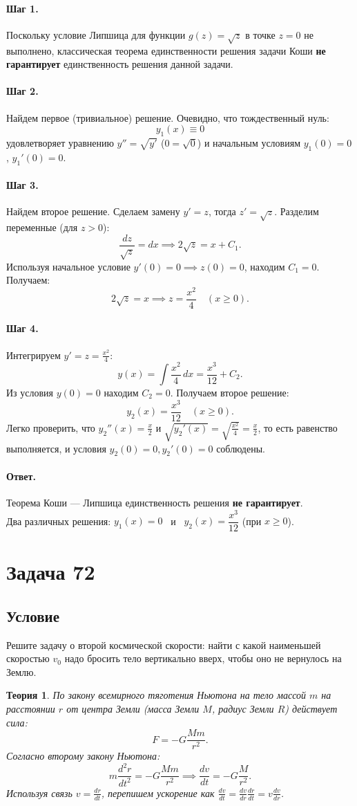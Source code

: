 \documentclass[12pt,a4paper]{article}
\theoremstyle{solution}
\newtheorem*{theory}{Теория}
\newcommand{\task}[1]{\newpage\section*{Задача #1}}
\newcommand{\answer}{\paragraph{Ответ.}}
\newcommand{\step}[1]{\paragraph{Шаг #1.}}
\begin{document}
\step{1} Поскольку условие Липшица для функции $g(z) = \sqrt{z}$ в точке $z = 0$ не выполнено, классическая теорема единственности решения задачи Коши \textbf{не гарантирует} единственность решения данной задачи.

\step{2} Найдем первое (тривиальное) решение. Очевидно, что тождественный нуль:
\[
y_1(x) \equiv 0
\]
удовлетворяет уравнению $y'' = \sqrt{y'}$ ($0 = \sqrt{0}$) и начальным условиям $y_1(0) = 0$, $y_1'(0) = 0$.

\step{3} Найдем второе решение. Сделаем замену $y' = z$, тогда $z' = \sqrt{z}$. Разделим переменные (для $z > 0$):
\[
\frac{dz}{\sqrt{z}} = dx \implies 2\sqrt{z} = x + C_1.
\]
Используя начальное условие $y'(0) = 0 \implies z(0) = 0$, находим $C_1 = 0$. Получаем:
\[
2\sqrt{z} = x \implies z = \frac{x^2}{4} \quad (x \geq 0).
\]

\step{4} Интегрируем $y' = z = \frac{x^2}{4}$:
\[
y(x) = \int \frac{x^2}{4}\,dx = \frac{x^3}{12} + C_2.
\]
Из условия $y(0) = 0$ находим $C_2 = 0$. Получаем второе решение:
\[
y_2(x) = \frac{x^3}{12} \quad (x \geq 0).
\]
Легко проверить, что $y_2''(x) = \frac{x}{2}$ и $\sqrt{y_2'(x)} = \sqrt{\frac{x^2}{4}} = \frac{x}{2}$, то есть равенство выполняется, и условия $y_2(0) = 0, y_2'(0) = 0$ соблюдены.

\answer
Теорема Коши — Липшица единственность решения \textbf{не гарантирует}. \\
Два различных решения: $y_1(x) = 0$ \ и \ $y_2(x) = \dfrac{x^3}{12}$ (при $x \geq 0$).

\task{72}
\subsection*{Условие}
Решите задачу о второй космической скорости: найти с какой наименьшей скоростью $v_0$ надо бросить тело вертикально вверх, чтобы оно не вернулось на Землю.

\begin{theory}
По закону всемирного тяготения Ньютона на тело массой $m$ на расстоянии $r$ от центра Земли (масса Земли $M$, радиус Земли $R$) действует сила:
\[
F = -G \frac{Mm}{r^2}.
\]
Согласно второму закону Ньютона:
\[
m \frac{d^2 r}{dt^2} = -G \frac{Mm}{r^2} \implies \frac{dv}{dt} = -G \frac{M}{r^2}.
\]
Используя связь $v = \frac{dr}{dt}$, перепишем ускорение как $\frac{dv}{dt} = \frac{dv}{dr} \frac{dr}{dt} = v \frac{dv}{dr}$.
\end{theory}
\end{document}
